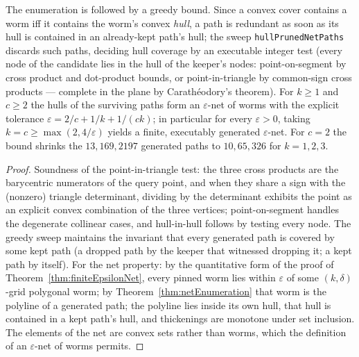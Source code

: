 \begin{theorem}
    \label{thm:hullPrunedNet}
    \leanok
    The enumeration is followed by a greedy bound. Since a convex cover
    contains a worm iff it contains the worm's convex \emph{hull}, a path is
    redundant as soon as its hull is contained in an already-kept path's hull;
    the sweep \texttt{hullPrunedNetPaths} discards such paths, deciding hull
    coverage by an executable integer test (every node of the candidate lies
    in the hull of the keeper's nodes: point-on-segment by cross product and
    dot-product bounds, or point-in-triangle by common-sign cross products —
    complete in the plane by Carath\'eodory's theorem). For $k \ge 1$ and
    $c \ge 2$ the hulls of the surviving paths form an $\varepsilon$-net of
    worms with the explicit tolerance $\varepsilon = 2/c + 1/k + 1/(ck)$; in
    particular for every $\varepsilon > 0$, taking
    $k = c \ge \max(2, 4/\varepsilon)$ yields a finite, executably generated
    $\varepsilon$-net. For $c = 2$ the bound shrinks the $13, 169, 2197$
    generated paths to $10, 65, 326$ for $k = 1, 2, 3$.
\end{theorem}
\begin{proof}
    Soundness of the point-in-triangle test: the three cross products are the
    barycentric numerators of the query point, and when they share a sign
    with the (nonzero) triangle determinant, dividing by the determinant
    exhibits the point as an explicit convex combination of the three
    vertices; point-on-segment handles the degenerate collinear cases, and
    hull-in-hull follows by testing every node. The greedy sweep maintains
    the invariant that every generated path is covered by some kept path (a
    dropped path by the keeper that witnessed dropping it; a kept path by
    itself). For the net property: by the quantitative form of the proof of
    Theorem~\ref{thm:finiteEpsilonNet}, every pinned worm lies within
    $\varepsilon$ of some $(k,\delta)$-grid polygonal worm; by
    Theorem~\ref{thm:netEnumeration} that worm is the polyline of a generated
    path; the polyline lies inside its own hull, that hull is contained in a
    kept path's hull, and thickenings are monotone under set inclusion. The
    elements of the net are convex sets rather than worms, which the
    definition of an $\varepsilon$-net of worms permits.
\end{proof}

